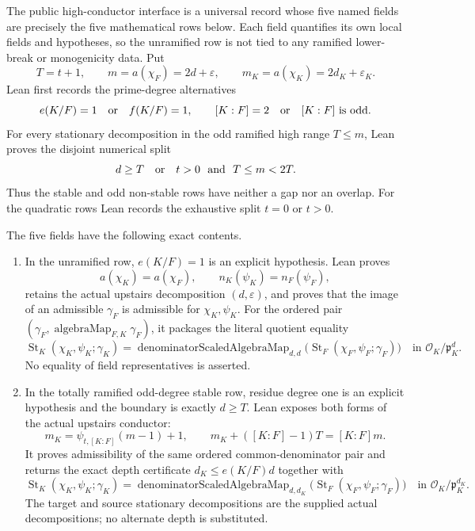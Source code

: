 \begin{theorem}
\label{mod:parameters-high}
The public high-conductor interface is a universal record whose five named
fields are precisely the five mathematical rows below.  Each field quantifies
its own local fields and hypotheses, so the unramified row is not tied to any
ramified lower-break or monogenicity data.  Put
\[
  T=t+1,
  \qquad m=a(\chi_F)=2d+\varepsilon,
  \qquad m_K=a(\chi_K)=2d_K+\varepsilon_K.
\]
Lean first records the prime-degree alternatives
\[
 e(K/F)=1\quad\hbox{or}\quad f(K/F)=1,
 \qquad
 [K:F]=2\quad\hbox{or}\quad [K:F]\text{ is odd}.
\]
For every stationary decomposition in the odd ramified high range
$T\leq m$, Lean proves the disjoint numerical split
\[
 d\geq T
 \quad\hbox{or}\quad
 t>0\ \hbox{ and }\ T\leq m<2T.
\]
Thus the stable and odd non-stable rows have neither a gap nor an overlap.
For the quadratic rows Lean records the exhaustive split $t=0$ or $t>0$.

The five fields have the following exact contents.
\begin{enumerate}
\item In the unramified row, $e(K/F)=1$ is an explicit hypothesis.  Lean
proves
\[
 a(\chi_K)=a(\chi_F),
 \qquad n_K(\psi_K)=n_F(\psi_F),
\]
retains the actual upstairs decomposition $(d,\varepsilon)$, and proves that
the image of an admissible $\gamma_F$ is admissible for $\chi_K,\psi_K$.
For the ordered pair
$(\gamma_F,\operatorname{algebraMap}_{F,K}\gamma_F)$, it packages the
literal quotient equality
\[
 \operatorname{St}_K(\chi_K,\psi_K;\gamma_K)
 =\operatorname{denominatorScaledAlgebraMap}_{d,d}
   \bigl(\operatorname{St}_F(\chi_F,\psi_F;\gamma_F)\bigr)
 \quad\text{in }\mathcal O_K/\mathfrak p_K^d.
\]
No equality of field representatives is asserted.

\item In the totally ramified odd-degree stable row, residue degree one is
an explicit hypothesis and the boundary is exactly $d\geq T$.  Lean exposes
both forms of the actual upstairs conductor:
\[
 m_K=\psi_{t,[K:F]}(m-1)+1,
 \qquad
 m_K+([K:F]-1)T=[K:F]m.
\]
It proves admissibility of the same ordered common-denominator pair and
returns the exact depth certificate $d_K\leq e(K/F)d$ together with
\[
 \operatorname{St}_K(\chi_K,\psi_K;\gamma_K)
 =\operatorname{denominatorScaledAlgebraMap}_{d,d_K}
   \bigl(\operatorname{St}_F(\chi_F,\psi_F;\gamma_F)\bigr)
 \quad\text{in }\mathcal O_K/\mathfrak p_K^{d_K}.
\]
The target and source stationary decompositions are the supplied actual
decompositions; no alternate depth is substituted.


\end{enumerate}
\end{theorem}
